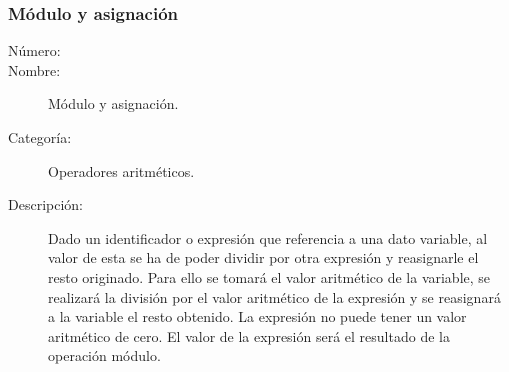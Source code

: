 \subsubsection{Módulo y asignación}
\begin{framed}
	\begin{description}
		\item [Número:] \cn
		\item [Nombre:] Módulo y asignación.
		\item [Categoría:] Operadores aritméticos.
		\item [Descripción:] Dado un identificador o expresión que referencia a una dato variable, al valor de esta se ha de poder dividir por
		otra expresión y reasignarle el resto originado. Para ello se tomará el valor aritmético de la variable, se realizará la división por el
		valor aritmético de la expresión y se reasignará a la variable el resto obtenido. La expresión no puede tener un valor aritmético de cero.
		El valor de la expresión será el resultado de la operación módulo.
	\end {description}
\end{framed}
